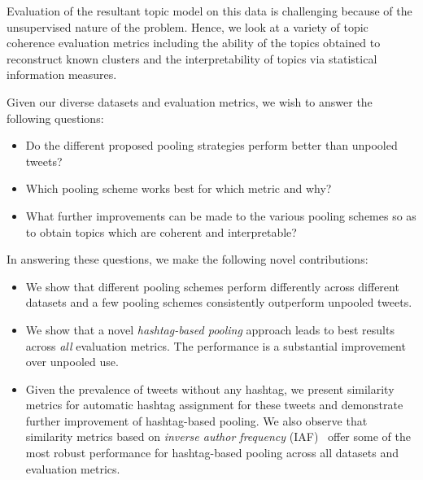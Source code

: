 \documentclass{sig-alternate}
\begin{document}
Evaluation of the resultant topic model on this data is challenging
because of the unsupervised nature of the problem.  Hence, we look at
a variety of topic coherence evaluation metrics including the ability
of the topics obtained to reconstruct known clusters and
the interpretability of topics via statistical information measures.

%

Given our diverse datasets and evaluation metrics, we wish to answer
the following questions:
\begin{itemize}
\item Do the different proposed pooling strategies perform better than
  unpooled tweets?
\item Which pooling scheme works best for which metric and why?
\item What further improvements can be made to the various pooling schemes
  so as to obtain topics which are coherent and interpretable?
\end{itemize}
In answering these questions, we make the following novel
contributions:
\begin{itemize}
\item We show that different pooling schemes perform differently
  across different datasets and a few pooling schemes consistently
  outperform unpooled tweets.
\item We show that a novel \emph{hashtag-based pooling} approach leads
  to best results across \emph{all} evaluation metrics.  The
  performance is a substantial improvement over unpooled use.
\item Given the prevalence of tweets without any hashtag, we present
  similarity metrics for automatic hashtag assignment for these tweets and
  demonstrate further improvement of hashtag-based pooling.  
  We also observe that 
  similarity metrics based on \emph{inverse author frequency}
  (IAF)~\cite{iaf} offer some of the most robust performance for 
  hashtag-based pooling across all datasets and evaluation metrics.
\end{itemize}
\end{document}
